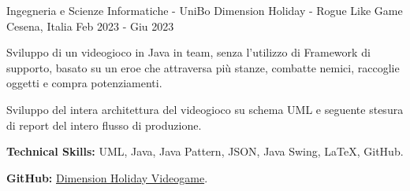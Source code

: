 \begin{cventries}
  \cventry
    {Ingegneria e Scienze Informatiche - UniBo} %
    {Dimension Holiday - Rogue Like Game} %
    {Cesena, Italia} %
    {Feb 2023 - Giu 2023} %
    {
      \begin{cvitems} %
        \item {Sviluppo di un videogioco in Java in team, senza l'utilizzo di Framework di supporto, basato su un eroe che attraversa più stanze, combatte nemici, raccoglie oggetti e compra potenziamenti.}
        \item {Sviluppo del intera architettura del videogioco su schema UML e seguente stesura di report del intero flusso di produzione.}
        \item {\textbf{Technical Skills:} UML, Java, Java Pattern, JSON, Java Swing, LaTeX, GitHub.}
        \item {\textbf{GitHub:} \href{https://github.com/elvisperlika/Dimension-Holiday-Videogame.git}{Dimension Holiday Videogame}.}
      \end{cvitems}
    }

\end{cventries}
